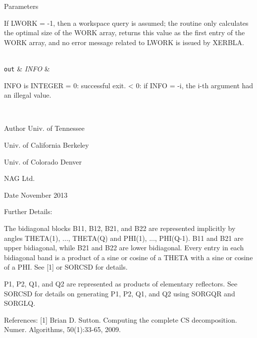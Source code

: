 \begin{DoxyParams}[1]{Parameters}
\begin{DoxyVerb}
          If LWORK = -1, then a workspace query is assumed; the routine
          only calculates the optimal size of the WORK array, returns
          this value as the first entry of the WORK array, and no error
          message related to LWORK is issued by XERBLA.\end{DoxyVerb}
\\
\hline
\mbox{\tt out}  & {\em I\+N\+F\+O} & \begin{DoxyVerb}          INFO is INTEGER
          = 0:  successful exit.
          < 0:  if INFO = -i, the i-th argument had an illegal value.\end{DoxyVerb}
 \\
\hline
\end{DoxyParams}
\begin{DoxyAuthor}{Author}
Univ. of Tennessee 

Univ. of California Berkeley 

Univ. of Colorado Denver 

N\+A\+G Ltd. 
\end{DoxyAuthor}
\begin{DoxyDate}{Date}
November 2013 
\end{DoxyDate}
\begin{DoxyParagraph}{Further Details\+: }
\begin{DoxyVerb}  The bidiagonal blocks B11, B12, B21, and B22 are represented
  implicitly by angles THETA(1), ..., THETA(Q) and PHI(1), ...,
  PHI(Q-1). B11 and B21 are upper bidiagonal, while B21 and B22 are
  lower bidiagonal. Every entry in each bidiagonal band is a product
  of a sine or cosine of a THETA with a sine or cosine of a PHI. See
  [1] or SORCSD for details.

  P1, P2, Q1, and Q2 are represented as products of elementary
  reflectors. See SORCSD for details on generating P1, P2, Q1, and Q2
  using SORGQR and SORGLQ.\end{DoxyVerb}
 
\end{DoxyParagraph}
\begin{DoxyParagraph}{References\+: }
\mbox{[}1\mbox{]} Brian D. Sutton. Computing the complete C\+S decomposition. Numer. Algorithms, 50(1)\+:33-\/65, 2009. 
\end{DoxyParagraph}
